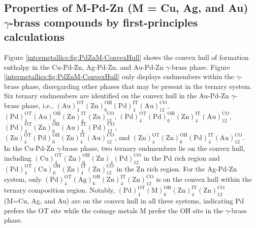 \subsection{Properties of M-Pd-Zn (M = Cu, Ag, and Au) $\gamma$-brass compounds by first-principles calculations} \label{intermetallics:ssec:PdZnMDFTresult}
Figure \ref{intermetallics:fig:PdZnM-ConvexHull} shows the convex hull of formation enthalpy in the Cu-Pd-Zn, Ag-Pd-Zn, and Au-Pd-Zn $\gamma$-brass phase. Figure \ref{intermetallics:fig:PdZnM-ConvexHull} only displays endmembers within the $\gamma$-brass phase, disregarding other phases that may be present in the ternary system. Six ternary endmembers are identified on the convex hull in the Au-Pd-Zn $\gamma$-brass phase, i.e., $\mathrm{\left(Au\right)_4^{OT}\left(Zn\right)_6^{OH}\left(Pd\right)_4^{IT}\left(Au\right)_{12}^{CO}}$, $\mathrm{\left(Pd\right)_4^{OT}\left(Au\right)_6^{OH}\left(Zn\right)_4^{IT}\left(Zn\right)_{12}^{CO}}$, $\mathrm{\left(Pd\right)_4^{OT}\left(Pd\right)_6^{OH}\left(Zn\right)_4^{IT}\left(Au\right)_{12}^{CO}}$, $\mathrm{\left(Pd\right)_4^{OT}\left(Zn\right)_6^{OH}\left(Au\right)_4^{IT}\left(Pd\right)_{12}^{CO}}$, \\$\mathrm{\left(Zn\right)_4^{OT}\left(Pd\right)_6^{OH}\left(Zn\right)_4^{IT}\left(Au\right)_{12}^{CO}}$, and $\mathrm{\left(Zn\right)_4^{OT}\left(Zn\right)_6^{OH}\left(Pd\right)_4^{IT}\left(Au\right)_{12}^{CO}}$. In the Cu-Pd-Zn $\gamma$-brass phase, two ternary endmembers lie on the convex hull, including $\mathrm{\left(Cu\right)_4^{OT}\left(Zn\right)_6^{OH}\left(Zn\right)_4\left(Pd\right)_{12}^{CO}}$ in the Pd rich region and $\mathrm{\left(Pd\right)_4^{OT}\left(Cu\right)_6^{OH}\left(Zn\right)_4^{IT}\left(Zn\right)_{12}^{CO}}$ in the Zn rich region. For the Ag-Pd-Zn system, only $\mathrm{\left(Pd\right)_4^{OT}\left(Ag\right)_6^{OH}\left(Zn\right)_4^{IT}\left(Zn\right)_{12}^{CO}}$ is on the convex hull within the ternary composition region. Notably, $\mathrm{\left(Pd\right)_4^{OT}\left(M\right)_6^{OH}\left(Zn\right)_4^{IT}\left(Zn\right)_{12}^{CO}}$ (M=Cu, Ag, and Au) are on the convex hull in all three systems, indicating Pd prefers the OT site while the coinage metals M prefer the OH site in the $\gamma$-brass phase. 

